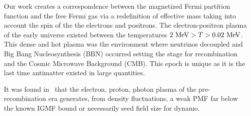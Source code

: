 \documentclass[a4paper]{article}
\begin{document}
Our work creates a correspondence between the magnetized Fermi partition function and the free Fermi gas via a redefinition of effective mass taking into account the spin of the the electrons and positrons. The electron-positron plasma of the early universe existed between the temperatures $2\text{ MeV}>T>0.02\text{ MeV}$.  This dense and hot plasma was the environment where neutrinos decoupled and Big Bang Nucleosynthesis (BBN) occurred setting the stage for recombination and the Cosmic Microwave Background (CMB). This epoch is unique as it is the last time antimatter existed in large quantities.

It was found in~\cite{gopal2004generation} that the electron, proton, photon plasma of the pre-recombination era generates, from density fluctuations, a weak PMF far below the known IGMF bound or necessarily seed field size for dynamo.



\end{document}
